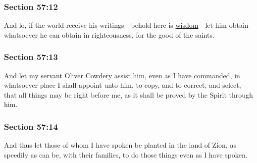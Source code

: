 	\subsubsection{Section 57:12} %
		\label{DC57-12}

		And lo, if the world receive his writings---behold here is \hyperref[WISDOM]{wisdom}---let him obtain whatsoever he can obtain in righteousness, for the good of the saints.


	\subsubsection{Section 57:13} %
		\label{DC57-13}

		And let my servant Oliver Cowdery assist him, even as I have commanded, in whatsoever place I shall appoint unto him, to copy, and to correct, and select, that all things may be right before me, as it shall be proved by the Spirit through him.


	\subsubsection{Section 57:14} %
		\label{DC57-14}

		And thus let those of whom I have spoken be planted in the land of Zion, as speedily as can be, with their families, to do those things even as I have spoken.


